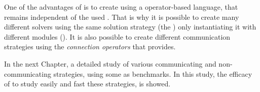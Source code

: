 One of the advantages of \posl{} is to create \ass{} using a operator-based language, that remains independent of the used \bothmodules{}. That is why it is possible to create many different solvers using the same solution strategy (the \as) only instantiating it with different modules (\bothmodules). It is also possible to create different communication strategies using the {\it connection operators} that \posl{} provides.

In the next Chapter, a detailed study of various communicating and non-communicating strategies, using some \CSPs{} as benchmarks. In this study, the efficacy of \posl{} to study easily and fast these strategies, is showed.